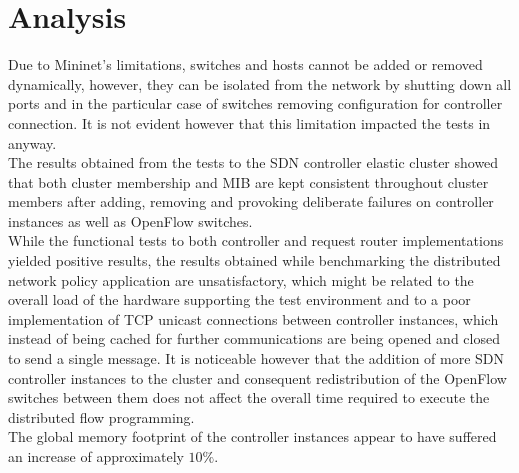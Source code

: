 \section{Analysis}
\label{section:considerations}
Due to Mininet's limitations, switches and hosts cannot be added or removed dynamically, however, they can be isolated from the network by shutting down all ports and in the particular case of switches removing configuration for controller connection.
It is not evident however that this limitation impacted the tests in anyway.\\
%
The results obtained from the tests to the \gls{SDN} controller elastic cluster showed that both cluster membership and \gls{MIB} are kept consistent throughout cluster members after adding, removing and provoking deliberate failures on controller instances as well as OpenFlow switches.\\
While the functional tests to both controller and request router implementations yielded positive results, the results obtained while benchmarking the distributed network policy application are unsatisfactory, which might be related to the overall load of the hardware supporting the test environment and to a poor implementation of \gls{TCP} unicast connections between controller instances, which instead of being cached for further communications are being opened and closed to send a single message. 
It is noticeable however that the addition of more \gls{SDN} controller instances to the cluster and consequent redistribution of the OpenFlow switches between them does not affect the overall time required to execute the distributed flow programming.\\
The global memory footprint of the controller instances appear to have suffered an increase of approximately $10\%$.
 